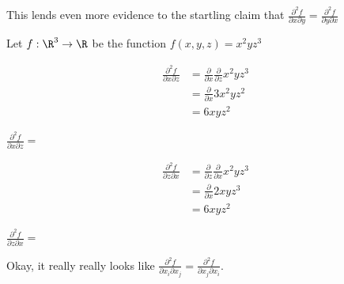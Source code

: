 \documentclass{ximera}
\begin{document}
\begin{question}
		This lends even more evidence to the startling claim that $\frac{\partial^2 f}{\partial x \partial y} = \frac{\partial^2 f}{\partial y \partial x}$
	\end{question}
	
	\begin{question}
		Let $f:\R^3 \to \R$ be the function $f(x,y,z) = x^2yz^3$
		\begin{solution}
			\begin{hint}
				\begin{align*}
					\frac{\partial^2 f}{\partial x \partial z} &= \frac{\partial }{ \partial x} \frac{\partial}{ \partial z} x^2yz^3\\
						&=\frac{\partial }{ \partial x} 3x^2yz^2\\
						&= 6xyz^2
				\end{align*}
			\end{hint}
			$\frac{\partial^2 f}{\partial x \partial z} = $
		\end{solution}
		\begin{solution}
		\begin{hint}
				\begin{align*}
					\frac{\partial^2 f}{\partial z \partial x} &= \frac{\partial }{ \partial z} \frac{\partial}{ \partial x} x^2yz^3\\
						&=\frac{\partial }{ \partial x} 2xyz^3\\
						&= 6xyz^2
				\end{align*}
			\end{hint}
			$\frac{\partial^2 f}{\partial z \partial x} = $\answer{6xyz^2}
		\end{solution}
		
		Okay, it really really looks like $\frac{\partial^2 f}{\partial x_i \partial x_j} = \frac{\partial^2 f}{\partial x_j \partial x_i} $.
		\end{question}
	
\end{document}
